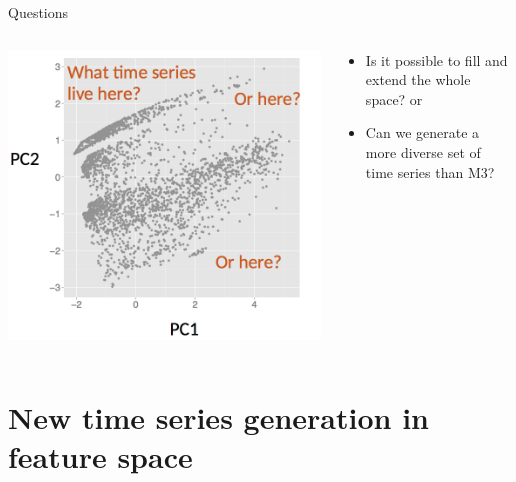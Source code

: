 \documentclass[12pt,ignorenonframetext,compress]{beamer}
\begin{document}
\begin{frame}{Questions}

\begin{columns}[T]
    \begin{column}{.5\textwidth}
    \begin{block}{}
    \includegraphics[width=\textwidth]{figures/holes.png}
    \end{block}
    \end{column}
     \begin{column}{.5\textwidth}
     \begin{block}{}
        \begin{itemize}
          \item Is it possible to fill and extend the whole space? or
          \item Can we generate a more diverse set of time series than M3?
        \end{itemize}
    \end{block}
    \end{column}
  \end{columns}

\end{frame}

\section{New time series generation in feature
space}\label{new-time-series-generation-in-feature-space}
\end{document}
